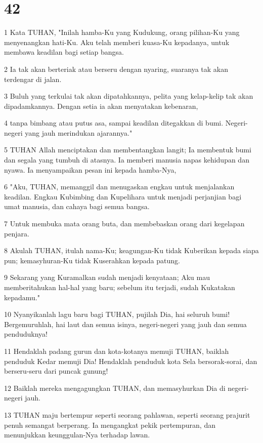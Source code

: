 \chapter{42}

\par 1 Kata TUHAN, "Inilah hamba-Ku yang Kudukung, orang pilihan-Ku yang menyenangkan hati-Ku. Aku telah memberi kuasa-Ku kepadanya, untuk membawa keadilan bagi setiap bangsa.
\par 2 Ia tak akan berteriak atau berseru dengan nyaring, suaranya tak akan terdengar di jalan.
\par 3 Buluh yang terkulai tak akan dipatahkannya, pelita yang kelap-kelip tak akan dipadamkannya. Dengan setia ia akan menyatakan kebenaran,
\par 4 tanpa bimbang atau putus asa, sampai keadilan ditegakkan di bumi. Negeri-negeri yang jauh merindukan ajarannya."
\par 5 TUHAN Allah menciptakan dan membentangkan langit; Ia membentuk bumi dan segala yang tumbuh di atasnya. Ia memberi manusia napas kehidupan dan nyawa. Ia menyampaikan pesan ini kepada hamba-Nya,
\par 6 "Aku, TUHAN, memanggil dan menugaskan engkau untuk menjalankan keadilan. Engkau Kubimbing dan Kupelihara untuk menjadi perjanjian bagi umat manusia, dan cahaya bagi semua bangsa.
\par 7 Untuk membuka mata orang buta, dan membebaskan orang dari kegelapan penjara.
\par 8 Akulah TUHAN, itulah nama-Ku; keagungan-Ku tidak Kuberikan kepada siapa pun; kemasyhuran-Ku tidak Kuserahkan kepada patung.
\par 9 Sekarang yang Kuramalkan sudah menjadi kenyataan; Aku mau memberitahukan hal-hal yang baru; sebelum itu terjadi, sudah Kukatakan kepadamu."
\par 10 Nyanyikanlah lagu baru bagi TUHAN, pujilah Dia, hai seluruh bumi! Bergemuruhlah, hai laut dan semua isinya, negeri-negeri yang jauh dan semua penduduknya!
\par 11 Hendaklah padang gurun dan kota-kotanya memuji TUHAN, baiklah penduduk Kedar memuji Dia! Hendaklah penduduk kota Sela bersorak-sorai, dan berseru-seru dari puncak gunung!
\par 12 Baiklah mereka mengagungkan TUHAN, dan memasyhurkan Dia di negeri-negeri jauh.
\par 13 TUHAN maju bertempur seperti seorang pahlawan, seperti seorang prajurit penuh semangat berperang. Ia mengangkat pekik pertempuran, dan menunjukkan keunggulan-Nya terhadap lawan.
